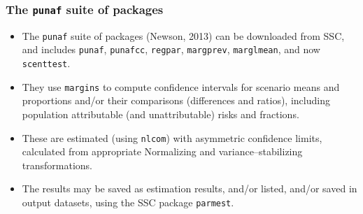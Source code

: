 \documentclass[11pt]{beamer}
\begin{document}
\begin{frame}
\frametitle{The \texttt{punaf} suite of packages}

\begin{itemize}

\item<2-> The \texttt{punaf} suite of packages (Newson, 2013)\cite{newson2013} can be downloaded from SSC,
and includes \texttt{punaf}, \texttt{punafcc}, \texttt{regpar}, \texttt{margprev}, \texttt{marglmean},
and now \texttt{scenttest}.

\item<3-> They use \texttt{margins} to compute confidence intervals
for scenario means and proportions and/or their comparisons
(differences and ratios),
including population attributable (and unattributable) risks and fractions.

\item<4-> These are estimated (using \texttt{nlcom}) with asymmetric confidence limits,
calculated from appropriate Normalizing and variance--stabilizing transformations.

\item<5-> The results may be saved as estimation results,
and/or listed, and/or saved in output datasets,
using the SSC package \texttt{parmest}.

\end{itemize}

\end{frame}
\end{document}
